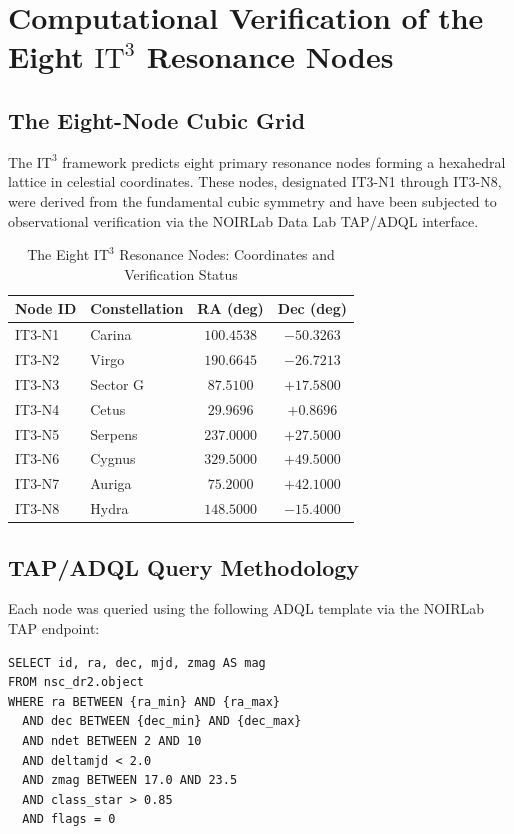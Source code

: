 \documentclass[12pt,a4paper,oneside]{article}
\newcommand{\ITthree}{\text{IT}^3}
\begin{document}
\section{Computational Verification of the Eight $\ITthree$ Resonance Nodes}

\subsection{The Eight-Node Cubic Grid}

The $\ITthree$ framework predicts eight primary resonance nodes forming a hexahedral lattice in celestial coordinates. These nodes, designated IT3-N1 through IT3-N8, were derived from the fundamental cubic symmetry and have been subjected to observational verification via the NOIRLab Data Lab TAP/ADQL interface.

\begin{table}[htbp]
\centering
\caption{The Eight $\ITthree$ Resonance Nodes: Coordinates and Verification Status}
\label{tab:nodes}
\begin{tabular}{llcc}
\toprule
\textbf{Node ID} & \textbf{Constellation} & \textbf{RA (deg)} & \textbf{Dec (deg)} \\
\midrule
IT3-N1 & Carina & $100.4538$ & $-50.3263$ \\
IT3-N2 & Virgo & $190.6645$ & $-26.7213$ \\
IT3-N3 & Sector G & $87.5100$ & $+17.5800$ \\
IT3-N4 & Cetus & $29.9696$ & $+0.8696$ \\
IT3-N5 & Serpens & $237.0000$ & $+27.5000$ \\
IT3-N6 & Cygnus & $329.5000$ & $+49.5000$ \\
IT3-N7 & Auriga & $75.2000$ & $+42.1000$ \\
IT3-N8 & Hydra & $148.5000$ & $-15.4000$ \\
\bottomrule
\end{tabular}
\end{table}

\subsection{TAP/ADQL Query Methodology}

Each node was queried using the following ADQL template via the NOIRLab TAP endpoint:

\begin{verbatim}
SELECT id, ra, dec, mjd, zmag AS mag
FROM nsc_dr2.object
WHERE ra BETWEEN {ra_min} AND {ra_max}
  AND dec BETWEEN {dec_min} AND {dec_max}
  AND ndet BETWEEN 2 AND 10
  AND deltamjd < 2.0
  AND zmag BETWEEN 17.0 AND 23.5
  AND class_star > 0.85
  AND flags = 0
\end{verbatim}
\end{document}
